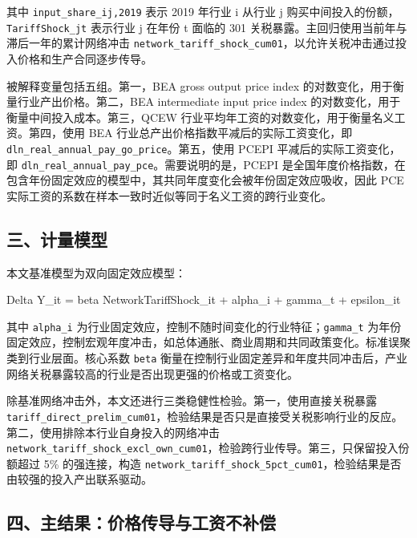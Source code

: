 \documentclass[
]{ctexart}
\newenvironment{Shaded}{}{}
\newcommand{\NormalTok}[1]{#1}
\begin{document}
其中 \texttt{input\_share\_ij,2019} 表示 2019 年行业 i 从行业 j
购买中间投入的份额，\texttt{TariffShock\_jt} 表示行业 j 在年份 t 面临的
301 关税暴露。主回归使用当前年与滞后一年的累计网络冲击
\texttt{network\_tariff\_shock\_cum01}，以允许关税冲击通过投入价格和生产合同逐步传导。

被解释变量包括五组。第一，BEA gross output price index
的对数变化，用于衡量行业产出价格。第二，BEA intermediate input price
index 的对数变化，用于衡量中间投入成本。第三，QCEW
行业平均年工资的对数变化，用于衡量名义工资。第四，使用 BEA
行业总产出价格指数平减后的实际工资变化，即
\texttt{dln\_real\_annual\_pay\_go\_price}。第五，使用 PCEPI
平减后的实际工资变化，即
\texttt{dln\_real\_annual\_pay\_pce}。需要说明的是，PCEPI
是全国年度价格指数，在包含年份固定效应的模型中，其共同年度变化会被年份固定效应吸收，因此
PCE 实际工资的系数在样本一致时近似等同于名义工资的跨行业变化。

\subsection{三、计量模型}\label{ux4e09ux8ba1ux91cfux6a21ux578b}

本文基准模型为双向固定效应模型：

\begin{Shaded}
\begin{Highlighting}[]
\NormalTok{Delta Y\_it = beta NetworkTariffShock\_it + alpha\_i + gamma\_t + epsilon\_it}
\end{Highlighting}
\end{Shaded}

其中 \texttt{alpha\_i}
为行业固定效应，控制不随时间变化的行业特征；\texttt{gamma\_t}
为年份固定效应，控制宏观年度冲击，如总体通胀、商业周期和共同政策变化。标准误聚类到行业层面。核心系数
\texttt{beta}
衡量在控制行业固定差异和年度共同冲击后，产业网络关税暴露较高的行业是否出现更强的价格或工资变化。

除基准网络冲击外，本文还进行三类稳健性检验。第一，使用直接关税暴露
\texttt{tariff\_direct\_prelim\_cum01}，检验结果是否只是直接受关税影响行业的反应。第二，使用排除本行业自身投入的网络冲击
\texttt{network\_tariff\_shock\_excl\_own\_cum01}，检验跨行业传导。第三，只保留投入份额超过
5\% 的强连接，构造
\texttt{network\_tariff\_shock\_5pct\_cum01}，检验结果是否由较强的投入产出联系驱动。

\subsection{四、主结果：价格传导与工资不补偿}\label{ux56dbux4e3bux7ed3ux679cux4ef7ux683cux4f20ux5bfcux4e0eux5de5ux8d44ux4e0dux8865ux507f}
\end{document}
